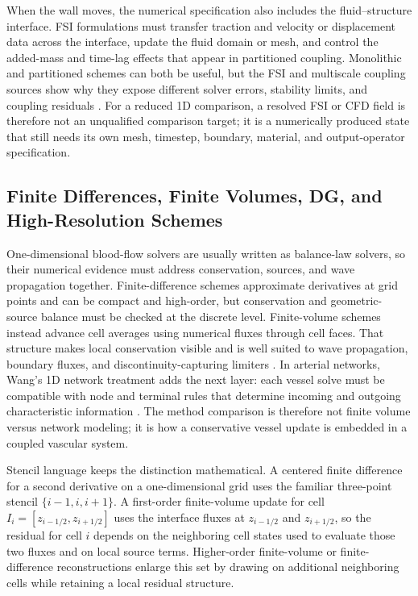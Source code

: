 When the wall moves, the numerical specification also includes the fluid--structure
interface. FSI formulations must transfer traction and velocity or displacement
data across the interface, update the fluid domain or mesh, and control the
added-mass and time-lag effects that appear in partitioned coupling. Monolithic
and partitioned schemes can both be useful, but the FSI and multiscale coupling
sources show why they expose different solver errors, stability limits, and
coupling residuals
\cite{FormaggiaEtAl2007FSICoupling,QuarteroniVeneziani2003GeometricalMultiscale}.
For a reduced 1D comparison, a resolved FSI or CFD field is therefore not an
unqualified comparison target; it is a numerically produced state that still
needs its own mesh, timestep, boundary, material, and output-operator
specification.

\subsection{Finite Differences, Finite Volumes, DG, and High-Resolution Schemes}
\label{subsec:numerical-methods-balance-law-families}

One-dimensional blood-flow solvers are usually written as balance-law solvers,
so their numerical evidence must address conservation, sources, and wave
propagation together.
Finite-difference schemes approximate derivatives at grid points and can be
compact and high-order, but conservation and geometric-source balance must be
checked at the discrete level. Finite-volume schemes instead advance cell
averages using numerical fluxes through cell faces. That structure makes local
conservation visible and is well suited to wave propagation, boundary fluxes,
and discontinuity-capturing limiters
\cite{LeVeque2002FiniteVolumeMethodsForHyperbolicProblems}. In arterial
networks, Wang's 1D network treatment adds the next layer: each vessel solve
must be compatible with node and terminal rules that determine incoming and
outgoing characteristic information \cite{Wang2014BloodFlowNetworks}. The
method comparison is therefore not finite volume versus network modeling; it is
how a conservative vessel update is embedded in a coupled vascular system.

Stencil language keeps the distinction mathematical. A centered finite
difference for a second derivative on a one-dimensional grid uses the familiar
three-point stencil $\{i-1,i,i+1\}$. A first-order finite-volume update for
cell $I_i=[z_{i-1/2},z_{i+1/2}]$ uses the interface fluxes at $z_{i-1/2}$ and
$z_{i+1/2}$, so the residual for cell $i$ depends on the neighboring cell
states used to evaluate those two fluxes and on local source terms. Higher-order
finite-volume or finite-difference reconstructions enlarge this set by drawing
on additional neighboring cells while retaining a local residual structure.

